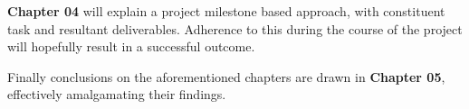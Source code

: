 \textbf{Chapter 04} will explain a project milestone based approach, with constituent task and resultant deliverables. Adherence to this during the course of the project will hopefully result in a successful outcome.

Finally conclusions on the aforementioned chapters are drawn in \textbf{Chapter 05}, effectively amalgamating their findings.


